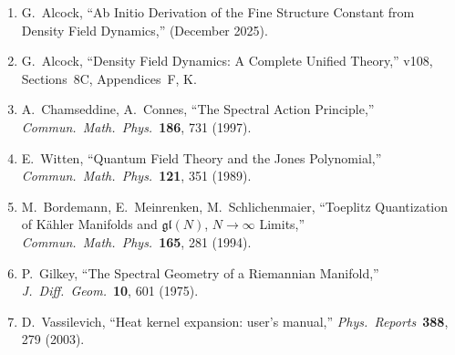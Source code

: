\documentclass[12pt,a4paper]{article}
\theoremstyle{definition}
\theoremstyle{remark}
\begin{document}
\begin{enumerate}
\item[{[1]}] G.~Alcock, ``Ab Initio Derivation of the Fine Structure Constant
  from Density Field Dynamics,'' (December 2025).

\item[{[2]}] G.~Alcock, ``Density Field Dynamics: A Complete Unified Theory,''
  v108, Sections~8C, Appendices~F, K.

\item[{[3]}] A.~Chamseddine, A.~Connes, ``The Spectral Action Principle,''
  \textit{Commun.\ Math.\ Phys.}\ \textbf{186}, 731 (1997).

\item[{[4]}] E.~Witten, ``Quantum Field Theory and the Jones Polynomial,''
  \textit{Commun.\ Math.\ Phys.}\ \textbf{121}, 351 (1989).

\item[{[5]}] M.~Bordemann, E.~Meinrenken, M.~Schlichenmaier,
  ``Toeplitz Quantization of K\"ahler Manifolds and $\mathfrak{gl}(N)$,
  $N \to \infty$ Limits,'' \textit{Commun.\ Math.\ Phys.}\
  \textbf{165}, 281 (1994).

\item[{[6]}] P.~Gilkey, ``The Spectral Geometry of a Riemannian Manifold,''
  \textit{J.\ Diff.\ Geom.}\ \textbf{10}, 601 (1975).

\item[{[7]}] D.~Vassilevich, ``Heat kernel expansion: user's manual,''
  \textit{Phys.\ Reports}\ \textbf{388}, 279 (2003).
\end{enumerate}
\end{document}
